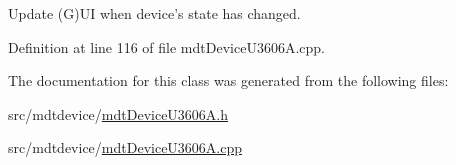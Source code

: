 Update (G)U\-I when device's state has changed. 



Definition at line 116 of file mdt\-Device\-U3606\-A.\-cpp.



The documentation for this class was generated from the following files\-:\begin{DoxyCompactItemize}
\item 
src/mdtdevice/\hyperlink{mdt_device_u3606_a_8h}{mdt\-Device\-U3606\-A.\-h}\item 
src/mdtdevice/\hyperlink{mdt_device_u3606_a_8cpp}{mdt\-Device\-U3606\-A.\-cpp}\end{DoxyCompactItemize}
